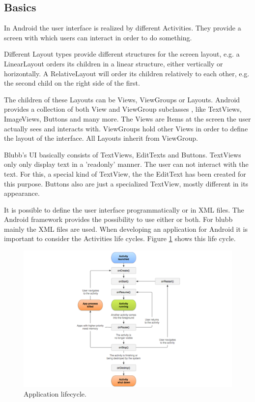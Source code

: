 \documentclass[12pt,a4paper,oneside]{report}
\newcommand{\appname}{blubb}
\begin{document}
\subsection{Basics}
In Android the user interface is realized by different Activities. They provide a screen with which users can interact in order to do something\citep{aDefActivities}.


 Different Layout types provide different structures for the screen layout, e.g. a LinearLayout orders its  children in a linear structure, either vertically or horizontally. A RelativeLayout will order its children relatively to each other, e.g. the second child on the right side of the first.
 
 The children of these Layouts can be Views, ViewGroups or Layouts. Android provides a collection of both View and ViewGroup subclasses \citep{aDefUIOV}, like TextViews, ImageViews, Buttons and many more. The Views are Items at the screen the user actually sees and interacts with. ViewGroups hold other Views in order to define the layout of the interface. All Layouts inherit from ViewGroup.
 
Blubb's UI basically consists of TextViews, EditTexts and Buttons. TextViews only only display text in a 'readonly' manner. The user can not interact with the text. For this, a special kind of TextView, the the EditText has been created for this purpose. Buttons also are just a specialized TextView, mostly different in its appearance. 


It is possible to define the user interface programmatically or in XML files. The Android framework provides the possibility to use either or both. For \appname{} mainly the XML files are used. 
When developing an application for Android it is important to consider the Activities life cycles. Figure \ref{fig:activitylivecycle} shows this life cycle.
 
\begin{figure}[!ht]
    \includegraphics[width=\linewidth]{activity_lifecycle.png}
	\caption{Application lifecycle.} 
	\label{fig:activitylivecycle}
\end{figure}
\end{document}
